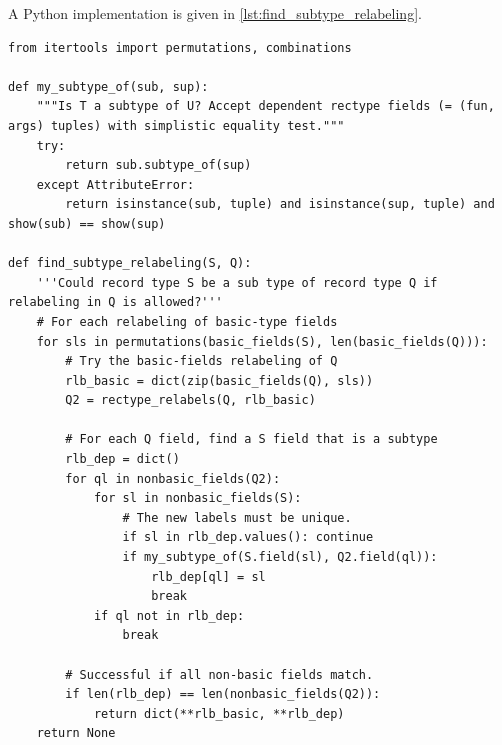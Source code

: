 A Python implementation is given in \autoref{lst:find_subtype_relabeling}.

\begin{lstlisting}[label={lst:find_subtype_relabeling}, caption=The \texttt{find\_subtype\_relabeling} function]
from itertools import permutations, combinations

def my_subtype_of(sub, sup):
    """Is T a subtype of U? Accept dependent rectype fields (= (fun, args) tuples) with simplistic equality test."""
    try:
        return sub.subtype_of(sup)
    except AttributeError:
        return isinstance(sub, tuple) and isinstance(sup, tuple) and show(sub) == show(sup)

def find_subtype_relabeling(S, Q):
    '''Could record type S be a sub type of record type Q if relabeling in Q is allowed?'''
    # For each relabeling of basic-type fields
    for sls in permutations(basic_fields(S), len(basic_fields(Q))):
        # Try the basic-fields relabeling of Q
        rlb_basic = dict(zip(basic_fields(Q), sls))
        Q2 = rectype_relabels(Q, rlb_basic)
        
        # For each Q field, find a S field that is a subtype
        rlb_dep = dict()
        for ql in nonbasic_fields(Q2):
            for sl in nonbasic_fields(S):
                # The new labels must be unique.
                if sl in rlb_dep.values(): continue
                if my_subtype_of(S.field(sl), Q2.field(ql)):
                    rlb_dep[ql] = sl
                    break
            if ql not in rlb_dep:
                break

        # Successful if all non-basic fields match.
        if len(rlb_dep) == len(nonbasic_fields(Q2)):
            return dict(**rlb_basic, **rlb_dep)
    return None
\end{lstlisting}

